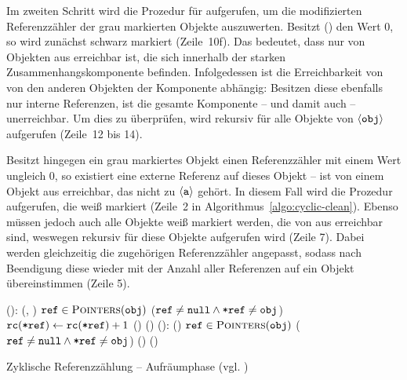 Im zweiten Schritt wird die Prozedur  für  aufgerufen, um die modifizierten Referenzzähler der grau markierten Objekte auszuwerten.
Besitzt () den Wert $0$, so wird  zunächst schwarz markiert (Zeile~10f).
Das bedeutet, dass  nur von Objekten aus erreichbar ist, die sich innerhalb der starken Zusammenhangskomponente befinden.
Infolgedessen ist die Erreichbarkeit von  von den anderen Objekten der Komponente abhängig: Besitzen diese ebenfalls nur interne Referenzen, ist die gesamte Komponente -- und damit auch  -- unerreichbar.
Um dies zu überprüfen, wird  rekursiv für alle Objekte von $\left\langle\texttt{obj}\right\rangle$ aufgerufen (Zeile~12 bis 14).

Besitzt hingegen ein grau markiertes Objekt  einen Referenzzähler mit einem Wert ungleich $0$, so existiert eine externe Referenz auf dieses Objekt --  ist von einem Objekt aus erreichbar, das nicht zu $\left\langle\texttt{a}\right\rangle$ gehört.
In diesem Fall wird die Prozedur  aufgerufen, die  weiß markiert (Zeile~2 in Algorithmus~\ref{algo:cyclic-clean}).
Ebenso müssen jedoch auch alle Objekte weiß markiert werden, die von  aus erreichbar sind, 
weswegen  rekursiv für diese Objekte aufgerufen wird (Zeile 7).
Dabei werden gleichzeitig die zugehörigen Referenzzähler angepasst, sodass nach Beendigung diese wieder mit der Anzahl aller Referenzen auf ein Objekt übereinstimmen (Zeile 5).

\begin{algorithm}[h]
\begin{algorithmic}[1]
	\State {}():
	\State \quad {}(, )		
	\State \quad \FOREACH $\texttt{ref} \in \textsc{Pointers}(\texttt{obj})$
	\State \quad \quad \IF ($\texttt{ref} \neq \texttt{null} \wedge \texttt{*ref} \neq \texttt{obj}$)
	\State \quad \quad \quad $\texttt{rc}(\texttt{*ref}) \gets \texttt{rc}(\texttt{*ref})+1$ 
	\State \quad \quad \quad \IF {}()
	\State \quad \quad \quad \quad {}()
	\Statex
	\State {}():
	\State \quad \IF {}()	
	\State \quad \quad \FOREACH $\texttt{ref} \in \textsc{Pointers}(\texttt{obj})$
	\State \quad \quad \quad \IF ($\texttt{ref} \neq \texttt{null} \wedge \texttt{*ref} \neq \texttt{obj}$)
	\State \quad \quad \quad \quad {}()
	\State \quad \quad {}()
\end{algorithmic}
\caption[Zyklische Referenzzählung -- Aufräumphase]{Zyklische Referenzzählung -- Aufräumphase (vgl. \cite[S. 33]{martinez1990})}
\label{algo:cyclic-clean}
\end{algorithm}

